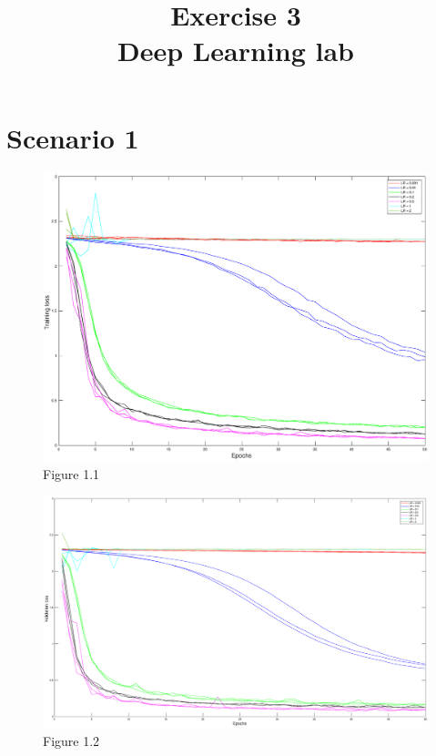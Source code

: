 \documentclass{article}
\title{  Exercise 3 \\
        \vspace{10px}
        \large Deep Learning lab}
\date{}
\begin{document}
\maketitle

\section*{Scenario 1}
	\begin{figure}[!htb]
        \centering
        \includegraphics[width=\textwidth]{figures/sc1_tr_loss}
        \captionsetup{labelformat=empty}
        \caption{Figure 1.1}
    \end{figure}
    \begin{figure}[!htb]
        \centering
        \includegraphics[width=\textwidth]{figures/sc1_val_loss}
        \captionsetup{labelformat=empty}
        \caption{Figure 1.2}
    \end{figure}
\end{document}
